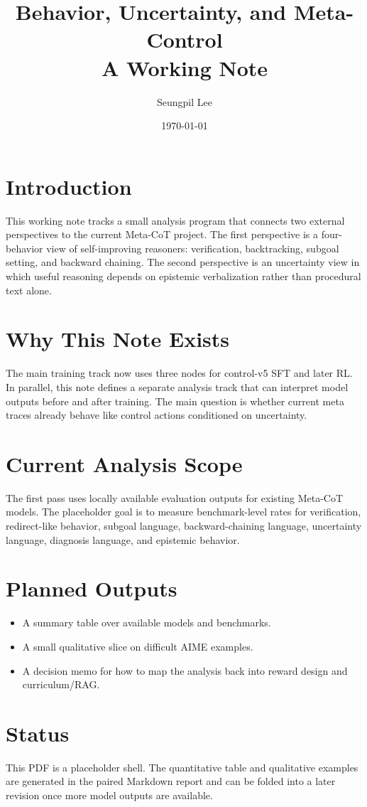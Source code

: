 \documentclass[11pt]{article}
\title{Behavior, Uncertainty, and Meta-Control\\A Working Note}
\author{Seungpil Lee}
\date{\today}
\begin{document}
\maketitle

\section{Introduction}
This working note tracks a small analysis program that connects two external perspectives to the
current Meta-CoT project. The first perspective is a four-behavior view of self-improving
reasoners: verification, backtracking, subgoal setting, and backward chaining. The second
perspective is an uncertainty view in which useful reasoning depends on epistemic verbalization
rather than procedural text alone.

\section{Why This Note Exists}
The main training track now uses three nodes for control-v5 SFT and later RL. In parallel, this note
defines a separate analysis track that can interpret model outputs before and after training. The main
question is whether current meta traces already behave like control actions conditioned on uncertainty.

\section{Current Analysis Scope}
The first pass uses locally available evaluation outputs for existing Meta-CoT models. The placeholder
goal is to measure benchmark-level rates for verification, redirect-like behavior, subgoal language,
backward-chaining language, uncertainty language, diagnosis language, and epistemic behavior.

\section{Planned Outputs}
\begin{itemize}
\item A summary table over available models and benchmarks.
\item A small qualitative slice on difficult AIME examples.
\item A decision memo for how to map the analysis back into reward design and curriculum/RAG.
\end{itemize}

\section{Status}
This PDF is a placeholder shell. The quantitative table and qualitative examples are generated in the
paired Markdown report and can be folded into a later revision once more model outputs are available.
\end{document}
